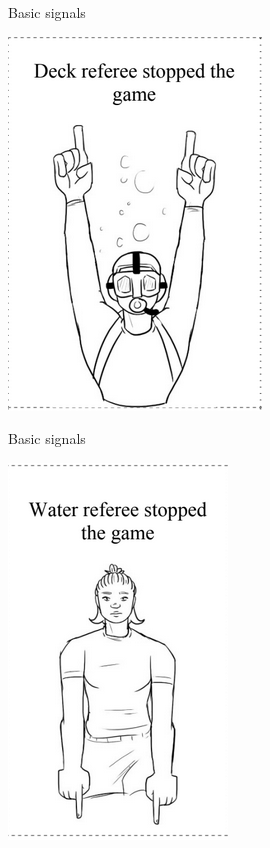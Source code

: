 \documentclass{beamer}
\begin{document}
    \begin{frame}{Basic signals}
        \begin{center}
            \includegraphics[scale=0.8]{surfaceRefSignal}
        \end{center}
    \end{frame}

    \begin{frame}{Basic signals}
        \begin{center}
            \includegraphics[scale=0.8]{waterRefSignal}
        \end{center}
    \end{frame}
\end{document}
